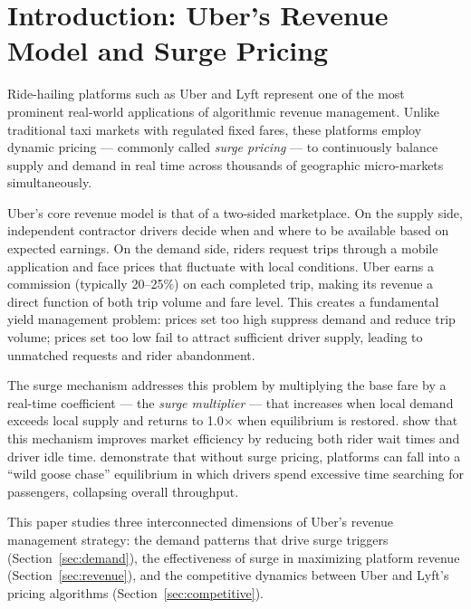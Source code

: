 \documentclass[11pt, letterpaper]{article}
\begin{document}
\tableofcontents
\newpage

\section{Introduction: Uber's Revenue Model and Surge Pricing}

Ride-hailing platforms such as Uber and Lyft represent one of the most
prominent real-world applications of algorithmic revenue management.
Unlike traditional taxi markets with regulated fixed fares, these platforms
employ dynamic pricing --- commonly called \textit{surge pricing} ---
to continuously balance supply and demand in real time across thousands
of geographic micro-markets simultaneously.

Uber's core revenue model is that of a two-sided marketplace. On the
supply side, independent contractor drivers decide when and where to be
available based on expected earnings. On the demand side, riders request
trips through a mobile application and face prices that fluctuate with
local conditions. Uber earns a commission (typically 20--25\%) on each
completed trip, making its revenue a direct function of both trip volume
and fare level. This creates a fundamental yield management problem:
prices set too high suppress demand and reduce trip volume; prices set
too low fail to attract sufficient driver supply, leading to unmatched
requests and rider abandonment.

The surge mechanism addresses this problem by multiplying the base fare
by a real-time coefficient --- the \textit{surge multiplier} --- that
increases when local demand exceeds local supply and returns to 1.0$\times$
when equilibrium is restored. \citet{hall2015effects} show that this mechanism
improves market efficiency by reducing both rider wait times and driver idle time.
\citet{castillo2017surge} demonstrate that without surge pricing, platforms can
fall into a ``wild goose chase'' equilibrium in which drivers spend excessive
time searching for passengers, collapsing overall throughput.

This paper studies three interconnected dimensions of Uber's revenue
management strategy: the demand patterns that drive surge triggers
(Section~\ref{sec:demand}), the effectiveness of surge in maximizing
platform revenue (Section~\ref{sec:revenue}), and the competitive
dynamics between Uber and Lyft's pricing algorithms
(Section~\ref{sec:competitive}).
\end{document}
